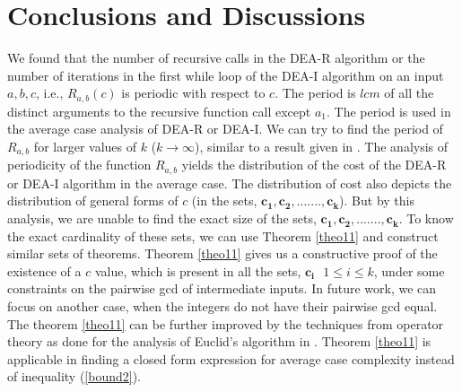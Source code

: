 \documentclass[pdflatex,sn-mathphys-num]{sn-jnl}%
\theoremstyle{thmstyleone}%
\theoremstyle{thmstyletwo}%
\theoremstyle{thmstylethree}%
\begin{document}
 \section{Conclusions and Discussions}\label{secCon}
 We found that the number of recursive calls in the DEA-R algorithm or the number of iterations in the first while loop of the DEA-I algorithm on an input $a,b,c$, i.e., $R_{a,b}(c)$ is periodic with respect to $c$. The period is $lcm$ of all the distinct arguments to the recursive function call except $a_1$. The period is used in the average case analysis of DEA-R or DEA-I.  We can try to find the period of $R_{a,b}$ for larger values of $k$ ($k\to \infty$), similar to a result given in  \cite{sanna2022lcm}.   The analysis of periodicity of the function $R_{a,b}$  yields the distribution of the cost of the DEA-R or DEA-I algorithm in the average case. The distribution of cost also depicts the distribution of general forms of $c$ (in the sets, $\mathbf{c_1},\mathbf{c_2},.......,\mathbf{c_k}$). But by this analysis, we are unable to find the exact size of the sets, $\mathbf{c_1},\mathbf{c_2},.......,\mathbf{c_k}$. To know the exact cardinality of these sets, we can use Theorem \ref{theo11} and construct similar sets of theorems. Theorem \ref{theo11} gives us a constructive proof of the existence of a $c$ value, which is present in all the sets, $\mathbf{c_i} \,\,\,\, 1\le i \le k$, under some constraints on the pairwise gcd of intermediate inputs.  In future work, we can focus on another case, when the integers do not have their pairwise gcd equal. 
 The theorem \ref{theo11}  can be further improved by the techniques from operator theory as done for the analysis of Euclid's algorithm in \cite{baladi2005euclidean}. Theorem \ref{theo11} is applicable in finding a closed form expression for average case complexity instead of inequality (\ref{bound2}). 
 
\end{document}
